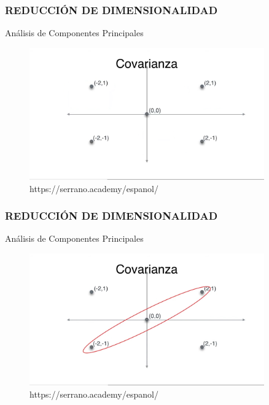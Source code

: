 \documentclass{beamer}
\begin{document}
\begin{frame}
	\frametitle{REDUCCIÓN DE DIMENSIONALIDAD}
	\begin{block}{Análisis de Componentes Principales}	
		\begin{figure}
			\includegraphics[width=0.9\textwidth]{PCA/IMG_3552.jpg}
			\caption{https://serrano.academy/espanol/}
		\end{figure}
	\end{block}
\end{frame}

\begin{frame}
	\frametitle{REDUCCIÓN DE DIMENSIONALIDAD}
	\begin{block}{Análisis de Componentes Principales}	
		\begin{figure}
			\includegraphics[width=0.9\textwidth]{PCA/IMG_3553.jpg}
			\caption{https://serrano.academy/espanol/}
		\end{figure}
	\end{block}
\end{frame}
\end{document}
